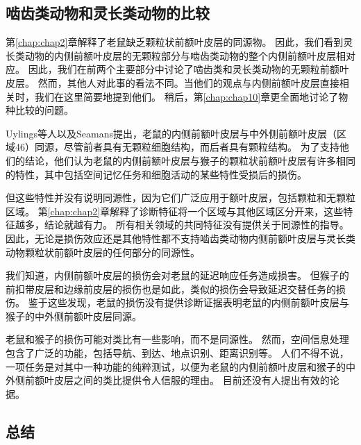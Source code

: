 \subsection{啮齿类动物和灵长类动物的比较}

第\ref{chap:chap2}章解释了老鼠缺乏颗粒状前额叶皮层的同源物。
因此，我们看到灵长类动物的内侧前额叶皮层的无颗粒部分与啮齿类动物的整个内侧前额叶皮层相对应。
因此，我们在前两个主要部分中讨论了啮齿类和灵长类动物的无颗粒前额叶皮层。
然而，其他人对此事的看法不同。当他们的观点与内侧前额叶皮层直接相关时，我们在这里简要地提到他们。
稍后，第\ref{chap:chap10}章更全面地讨论了物种比较的问题。\par


Uylings等人\cite{uylings2003rats}以及Seamans\cite{seamans2008comparing}提出，老鼠的内侧前额叶皮层与中外侧前额叶皮层（区域46）同源，尽管前者具有无颗粒细胞结构，而后者具有颗粒结构。
为了支持他们的结论，他们认为老鼠的内侧前额叶皮层与猴子的颗粒状前额叶皮层有许多相同的特性，其中包括空间记忆任务和细胞活动的某些特性受损后的损伤。\par


但这些特性并没有说明同源性，因为它们广泛应用于额叶皮层，包括颗粒和无颗粒区域。
第\ref{chap:chap2}章解释了诊断特征将一个区域与其他区域区分开来，这些特征越多，结论就越有力。
所有相关领域的共同特征没有提供关于同源性的指导。
因此，无论是损伤效应还是其他特性都不支持啮齿类动物内侧前额叶皮层与灵长类动物颗粒状前额叶皮层的任何部分的同源性。\par


我们知道，内侧前额叶皮层的损伤会对老鼠的延迟响应任务造成损害\cite{kolb1974double}。
但猴子的前扣带皮层和边缘前皮层的损伤也是如此\cite{meunier1997effects}，类似的损伤会导致延迟交替任务的损伤\cite{rushworth2003effect}。
鉴于这些发现，老鼠的损伤没有提供诊断证据表明老鼠的内侧前额叶皮层与猴子的中外侧前额叶皮层同源。\par


老鼠和猴子的损伤可能对类比有一些影响，而不是同源性\cite{brown2002rodent}。
然而，空间信息处理包含了广泛的功能，包括导航、到达、地点识别、距离识别等。
人们不得不说，一项任务是对其中一种功能的纯粹测试，以便为老鼠的内侧前额叶皮层和猴子的中外侧前额叶皮层之间的类比提供令人信服的理由。
目前还没有人提出有效的论据。\par



\subsection{总结}


